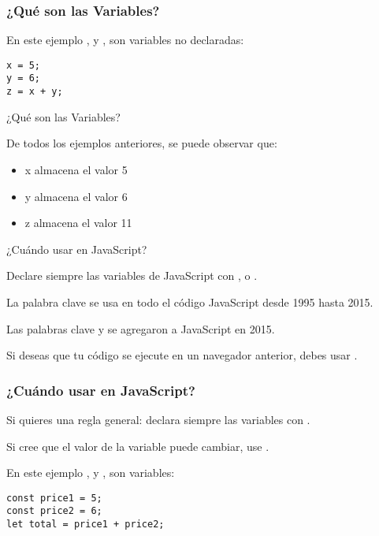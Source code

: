\begin{frame}[fragile]
  \frametitle{¿Qué son las Variables?}

  En este ejemplo ,  y , son variables
  no declaradas:

  \vspace{\baselineskip}
  \begin{lstlisting}
x = 5;
y = 6;
z = x + y;
  \end{lstlisting}
\end{frame}

\begin{frame}[c]{¿Qué son las Variables?}

  De todos los ejemplos anteriores, se puede observar que:

  \vspace{\baselineskip}
  \begin{itemize}
    \item x almacena el valor 5
    \item y almacena el valor 6
    \item z almacena el valor 11
  \end{itemize}
\end{frame}

\begin{frame}[c]{¿Cuándo usar  en JavaScript?}

  Declare siempre las variables de JavaScript con ,
   o .

  \vspace{\baselineskip}
  La palabra clave  se usa en todo el código JavaScript
  desde 1995 hasta 2015.

  \vspace{\baselineskip}
  Las palabras clave  y  se agregaron
  a JavaScript en 2015.

  \vspace{\baselineskip}
  Si deseas que tu código se ejecute en un navegador anterior,
  debes usar .
\end{frame}

\begin{frame}[fragile]
  \frametitle{¿Cuándo usar  en JavaScript?}

  Si quieres una regla general: declara siempre las variables
  con .

  \vspace{\baselineskip}
  Si cree que el valor de la variable puede cambiar, use .

  \vspace{\baselineskip}
  En este ejemplo ,  y , son variables:

  \vspace{\baselineskip}
  \begin{lstlisting}
const price1 = 5;
const price2 = 6;
let total = price1 + price2;
  \end{lstlisting}
\end{frame}

